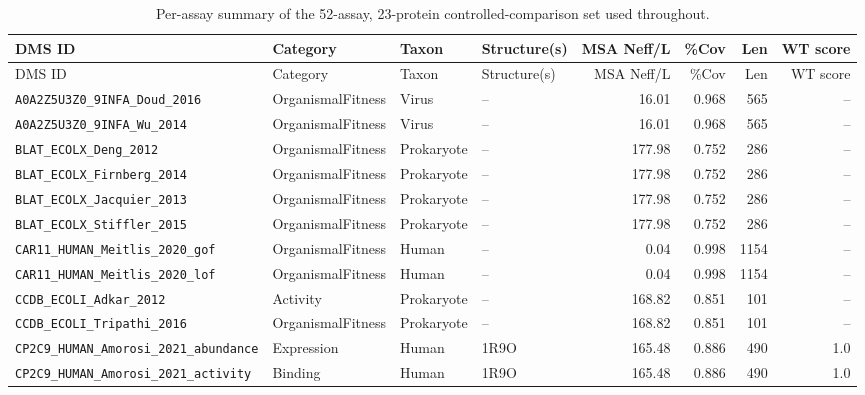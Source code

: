 \documentclass{article}
\begin{document}
\small
\begin{longtable}{llllrrrr}
  \caption{Per-assay summary of the 52-assay, 23-protein controlled-comparison set used throughout.}
  \label{tab:t1} \\
  \toprule
  DMS ID & Category & Taxon & Structure(s) & MSA Neff/L & \%Cov & Len & WT score \\
  \midrule
  \endfirsthead
  \toprule
  DMS ID & Category & Taxon & Structure(s) & MSA Neff/L & \%Cov & Len & WT score \\
  \midrule
  \endhead
  \bottomrule
  \endfoot
  \texttt{\scriptsize A0A2Z5U3Z0\_9INFA\_Doud\_2016} & OrganismalFitness & Virus & {\scriptsize --} & 16.01 & 0.968 & 565 & -- \\
  \texttt{\scriptsize A0A2Z5U3Z0\_9INFA\_Wu\_2014} & OrganismalFitness & Virus & {\scriptsize --} & 16.01 & 0.968 & 565 & -- \\
  \texttt{\scriptsize BLAT\_ECOLX\_Deng\_2012} & OrganismalFitness & Prokaryote & {\scriptsize --} & 177.98 & 0.752 & 286 & -- \\
  \texttt{\scriptsize BLAT\_ECOLX\_Firnberg\_2014} & OrganismalFitness & Prokaryote & {\scriptsize --} & 177.98 & 0.752 & 286 & -- \\
  \texttt{\scriptsize BLAT\_ECOLX\_Jacquier\_2013} & OrganismalFitness & Prokaryote & {\scriptsize --} & 177.98 & 0.752 & 286 & -- \\
  \texttt{\scriptsize BLAT\_ECOLX\_Stiffler\_2015} & OrganismalFitness & Prokaryote & {\scriptsize --} & 177.98 & 0.752 & 286 & -- \\
  \texttt{\scriptsize CAR11\_HUMAN\_Meitlis\_2020\_gof} & OrganismalFitness & Human & {\scriptsize --} & 0.04 & 0.998 & 1154 & -- \\
  \texttt{\scriptsize CAR11\_HUMAN\_Meitlis\_2020\_lof} & OrganismalFitness & Human & {\scriptsize --} & 0.04 & 0.998 & 1154 & -- \\
  \texttt{\scriptsize CCDB\_ECOLI\_Adkar\_2012} & Activity & Prokaryote & {\scriptsize --} & 168.82 & 0.851 & 101 & -- \\
  \texttt{\scriptsize CCDB\_ECOLI\_Tripathi\_2016} & OrganismalFitness & Prokaryote & {\scriptsize --} & 168.82 & 0.851 & 101 & -- \\
  \texttt{\scriptsize CP2C9\_HUMAN\_Amorosi\_2021\_abundance} & Expression & Human & {\scriptsize 1R9O} & 165.48 & 0.886 & 490 & 1.0 \\
  \texttt{\scriptsize CP2C9\_HUMAN\_Amorosi\_2021\_activity} & Binding & Human & {\scriptsize 1R9O} & 165.48 & 0.886 & 490 & 1.0 \\

\end{longtable}
\end{document}
